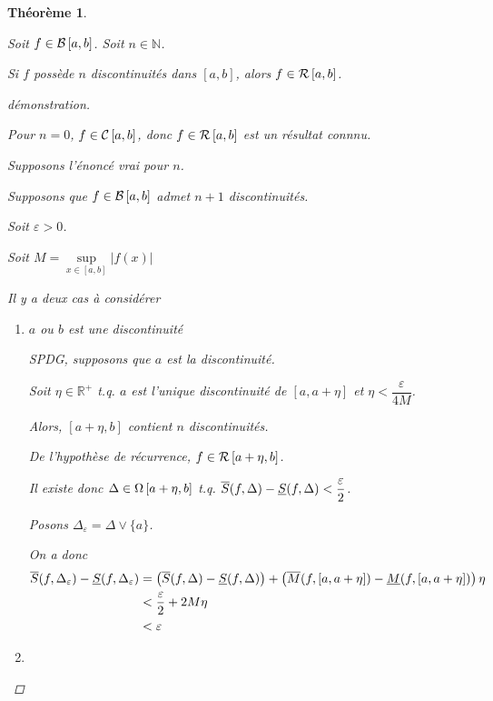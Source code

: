 \documentclass{report}
\newcommand*{\raffinement}[2]{#1 \vee #2}
\newcommand*{\abs}[1]{\left| #1 \right|}
\newcommand*{\eps}{\varepsilon}
\newcommand*{\reels}{\mathbb{R}}
\newcommand*{\naturels}{\mathbb{N}}
\newtheorem*{thm}{Th\'eor\`eme}
\theoremstyle{definition}
\theoremstyle{remark}
\begin{document}
	\begin{thm}
		~

		Soit $f \in \bornee$. Soit $n \in \naturels$.

		Si $f$ poss\`ede $n$ discontinuit\'es dans $[a,b]$, alors $f \in \riemann$.
		\begin{proof}[d\'emonstration]~

			Pour $n=0$, $f \in \continue$, donc $f \in \riemann$ est un r\'esultat connnu.

			Supposons l'\'enonc\'e vrai pour $n$.

			Supposons que $f \in \bornee$ admet $n+1$ discontinuit\'es.

			Soit $\eps>0$.

			Soit $M=\sup\limits_{x\in[a,b]}\abs{f(x)}$

			Il y a deux cas \`a consid\'erer

			\begin{enumerate}
				\item $a$ ou $b$ est une discontinuit\'e

				SPDG, supposons que $a$ est la discontinuit\'e.

				Soit $\eta \in \reels^+$ t.q. $a$ est l'unique discontinuit\'e de $[a,a+\eta]$ et $\eta < \dfrac{\eps}{4M}$.

				Alors, $[a+\eta,b]$ contient $n$ discontinuit\'es.

				De l'hypoth\`ese de r\'ecurrence, $f \in \riemann[a+\eta,b]$.

				Il existe donc $\Delta \in \partitions[a+\eta,b]$ t.q. $\ssup{f} - \sinf{f} < \dfrac{\eps}{2}$.

				Posons $\Delta_\eps = \raffinement{\Delta}{\{a\}}$.

				On a donc
				\begin{align*}
					\ssup{f}[\Delta_\eps] - \sinf{f}[\Delta_\eps]&= \left( \ssup{f} - \sinf{f} \right) + \left( \msup{f}[[a,a+\eta]] - \minf{f}[[a,a+\eta]] \right) \eta\\
					&< \frac{\eps}{2} + 2M\eta\\
					&<\eps
				\end{align*}
				\item
			\end{enumerate}
		\end{proof}
	\end{thm}
\end{document}
